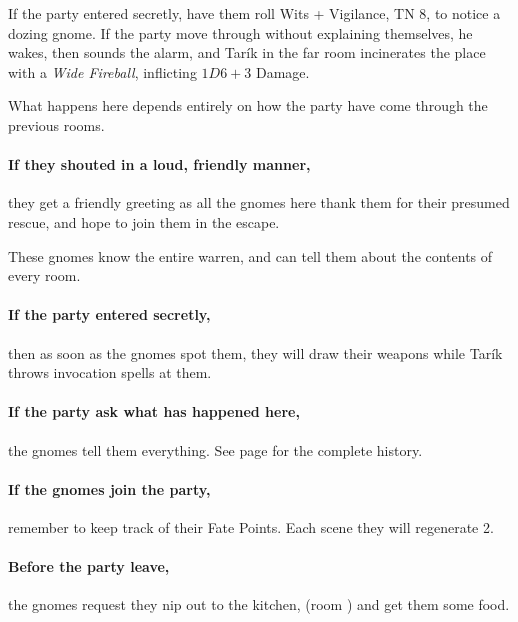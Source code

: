 \begin{multicols}{2}
\begin{boxtext}
\end{boxtext}

If the party entered secretly, have them roll Wits + Vigilance, TN 8, to notice a dozing gnome.
If the party move through without explaining themselves, he wakes, then sounds the alarm, and Tar\'ik in the far room incinerates the place with a \textit{Wide Fireball}, inflicting $1D6 +3$ Damage.



What happens here depends entirely on how the party have come through the previous rooms.

\paragraph{If they shouted in a loud, friendly manner,}
they get a friendly greeting as all the gnomes here thank them for their presumed rescue, and hope to join them in the escape.

These gnomes know the entire warren, and can tell them about the contents of every room.

\paragraph{If the party entered secretly,}
then as soon as the gnomes spot them, they will draw their weapons while Tar\'ik throws invocation spells at them.

\paragraph{If the party ask what has happened here,}
the gnomes tell them everything.
See page \pageref{invasionhistory} for the complete history.

\paragraph{If the gnomes join the party,}
remember to keep track of their Fate Points.
Each scene they will regenerate 2.

\setcounter{enc}{\value{list}}
\addtocounter{enc}{1}

\paragraph{Before the party leave,}
the gnomes request they nip out to the kitchen, (room ) and get them some food.


\end{multicols}
